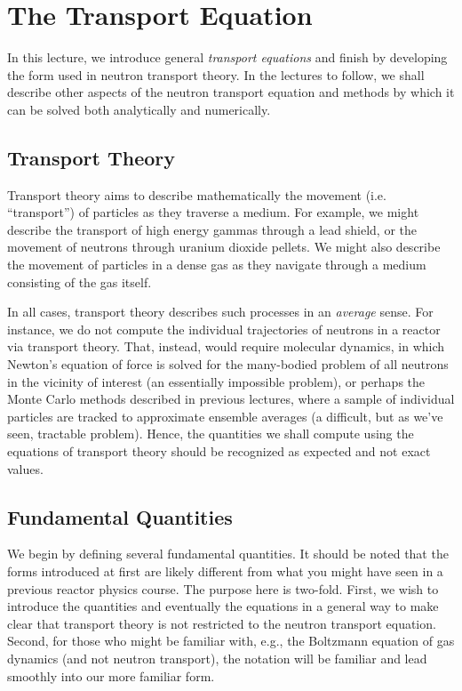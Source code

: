 \chapter{The Transport Equation}

In this lecture, we introduce general \textit{transport equations} and finish by developing the form used in neutron transport theory.  In the lectures to follow, we shall describe other aspects of the neutron transport equation and methods by which it can be solved both analytically and numerically.

\section*{Transport Theory}

Transport theory aims to describe mathematically the movement (i.e. ``transport'') of particles as they traverse a medium.  For example, we might describe the transport of high energy gammas through a lead shield, or the movement of neutrons through uranium dioxide pellets.  We might also describe the movement of particles in a dense gas as they navigate through a medium consisting of the gas itself.

In all cases, transport theory describes such processes in an \textit{average} sense.  For instance, we do not compute the individual trajectories of neutrons in a reactor via transport theory.  That, instead, would require molecular dynamics, in which Newton's equation of force is solved for the many-bodied problem of all neutrons in the vicinity of interest (an essentially impossible problem), or perhaps the Monte Carlo methods described in previous lectures, where a sample of individual particles are tracked to approximate ensemble averages (a difficult, but as we've seen, tractable problem).  Hence, the quantities we shall compute using the equations of transport theory should be recognized as expected and not exact values.

\section*{Fundamental Quantities}

We begin by defining several fundamental quantities.  It should be noted that the forms introduced at first are likely different from what you might have seen in a previous reactor physics course.  The purpose here is two-fold.  First, we wish to introduce the quantities and eventually the equations in a general way to make clear that transport theory is not restricted to the neutron transport equation.  Second, for those who might be familiar with, e.g., the Boltzmann equation of gas dynamics (and not neutron transport), the notation will be familiar and lead smoothly into our more familiar form.

